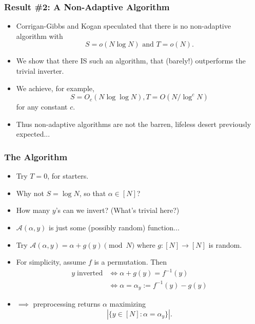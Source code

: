 \documentclass[usenames, dvipsnames, t, table]{beamer}
\newcommand{\A}{\mathcal{A}}
\begin{document}
  \begin{frame}
    \frametitle{Result \#2: A Non-Adaptive Algorithm}
    \begin{itemize}
    \item Corrigan-Gibbs and Kogan speculated that there is no non-adaptive algorithm with
      \[S = o(N \log N) \text{ and } T = o(N).\]
      \nocite{CorriganGibbs19}
    \item We show that there IS such an algorithm, that (barely!) outperforms the trivial inverter.
      \pause
    \item We achieve, for example,
      \[S = O_c(N \log \log N), T = O(N / \log^c N)\]
      for any constant $c$.
          \mypause
          \item Thus non-adaptive algorithms are not the barren, lifeless desert previously expected...
    \end{itemize}
  \end{frame}

  \begin{frame}
    \frametitle{The Algorithm}
    \begin{itemize}
    \item Try $T = 0$, for starters.
      \pause
    \item Why not $S = \log N$, so that $\alpha \in [N]$?
      \pause
    \item How many $y$'s can we invert? (What's trivial here?)
      \pause
    \item $\A(\alpha, y)$ is just some (possibly random) function...
      \pause
    \item Try $\A(\alpha, y) = \alpha + g(y) \pmod N$ where $g: [N] \to [N]$ is random.
      \pause
  \item For simplicity, assume $f$ is a permutation. Then
    \begin{align*}
      y \; \text{inverted} &\Leftrightarrow \alpha + g(y) = f^{-1}(y) \\
                        &\Leftrightarrow \alpha = \alpha_y := f^{-1}(y) - g(y)
    \end{align*}
    \mypause
  \item $\implies$ preprocessing returns $\alpha$ maximizing
\[|\{y \in [N] : \alpha = \alpha_y\}|.\]
    \end{itemize}
  \end{frame}
\end{document}
